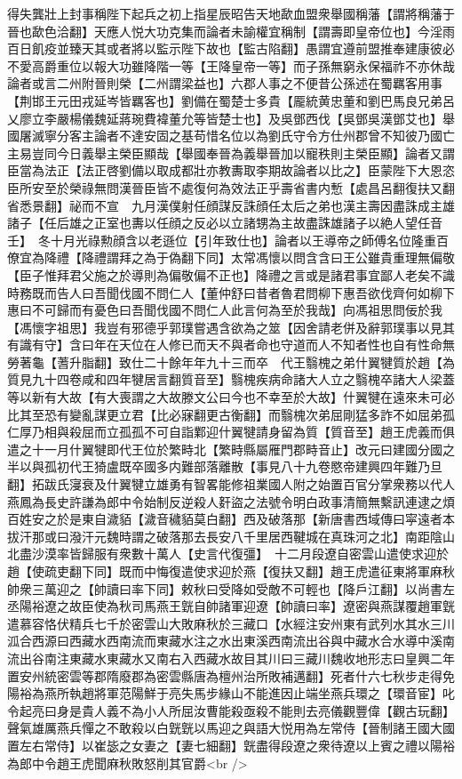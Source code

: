 得失龔壯上封事稱陛下起兵之初上指星辰昭告天地歃血盟衆舉國稱藩【謂將稱藩于晉也歃色洽翻】天應人悦大功克集而論者未諭權宜稱制【謂壽即皇帝位也】今淫雨百日飢疫並臻天其或者將以監示陛下故也【監古陷翻】愚謂宜遵前盟推奉建康彼必不愛高爵重位以報大功雖降階一等【王降皇帝一等】而子孫無窮永保福祚不亦休哉論者或言二州附晉則榮【二州謂梁益也】六郡人事之不便昔公孫述在蜀羈客用事【荆邯王元田戎延岑皆羈客也】劉備在蜀楚士多貴【龎統黄忠董和劉巴馬良兄弟呂乂廖立李嚴楊儀魏延蔣琬費褘董允等皆楚士也】及吳鄧西伐【吳鄧吳漢鄧艾也】舉國屠滅寧分客主論者不達安固之基苟惜名位以為劉氏守令方仕州郡曾不知彼乃國亡主易豈同今日義舉主榮臣顯哉【舉國奉晉為義舉晉加以寵秩則主榮臣顯】論者又謂臣當為法正【法正啓劉備以取成都壯亦教夀取李期故論者以比之】臣蒙陛下大恩恣臣所安至於榮祿無問漢晉臣皆不處復何為效法正乎壽省書内慙【處昌呂翻復扶又翻省悉景翻】祕而不宣　九月漢僕射任顔謀反誅顔任太后之弟也漢主壽因盡誅成主雄諸子【任后雄之正室也夀以任顔之反必以立諸甥為主故盡誅雄諸子以絶人望任音壬】　冬十月光祿勲顔含以老遜位【引年致仕也】論者以王導帝之師傅名位隆重百僚宜為降禮【降禮謂拜之為于偽翻下同】太常馮懷以問含含曰王公雖貴重理無偏敬【臣子惟拜君父施之於導則為偏敬偏不正也】降禮之言或是諸君事宜鄙人老矣不識時務既而告人曰吾聞伐國不問仁人【董仲舒曰昔者魯君問柳下惠吾欲伐齊何如柳下惠曰不可歸而有憂色曰吾聞伐國不問仁人此言何為至於我哉】向馮祖思問佞於我【馮懷字祖思】我豈有邪德乎郭璞嘗遇含欲為之筮【因舍請老併及辭郭璞事以見其有識有守】含曰年在天位在人修已而天不與者命也守道而人不知者性也自有性命無勞著龜【蓍升脂翻】致仕二十餘年年九十三而卒　代王翳槐之弟什翼犍質於趙【為質見九十四卷咸和四年犍居言翻質音至】翳槐疾病命諸大人立之翳槐卒諸大人梁蓋等以新有大故【有大喪謂之大故滕文公曰今也不幸至於大故】什翼犍在遠來未可必比其至恐有變亂謀更立君【比必寐翻更古衡翻】而翳槐次弟屈剛猛多詐不如屈弟孤仁厚乃相與殺屈而立孤孤不可自詣鄴迎什翼犍請身留為質【質音至】趙王虎義而俱遣之十一月什翼犍即代王位於繁畤北【繁畤縣屬雁門郡畤音止】改元曰建國分國之半以與孤初代王猗盧既卒國多内難部落離散【事見八十九卷愍帝建興四年難乃旦翻】拓跋氏寖衰及什翼犍立雄勇有智畧能修祖業國人附之始置百官分掌衆務以代人燕鳳為長史許謙為郎中令始制反逆殺人姧盜之法號令明白政事清簡無繫訊連逮之煩百姓安之於是東自濊貊【濊音穢貊莫白翻】西及破落那【新唐書西域傳曰寜遠者本拔汗那或曰潑汗元魏時謂之破落那去長安八千里居西鞬城在真珠河之北】南距陰山北盡沙漠率皆歸服有衆數十萬人【史言代復彊】　十二月段遼自密雲山遣使求迎於趙【使疏吏翻下同】既而中悔復遣使求迎於燕【復扶又翻】趙王虎遣征東將軍麻秋帥衆三萬迎之【帥讀曰率下同】敕秋曰受降如受敵不可輕也【降戶江翻】以尚書左丞陽裕遼之故臣使為秋司馬燕王皝自帥諸軍迎遼【帥讀曰率】遼密與燕謀覆趙軍皝遣慕容恪伏精兵七千於密雲山大敗麻秋於三藏口【水經注安州東有武列水其水三川泒合西源曰西藏水西南流而東藏水注之水出東溪西南流出谷與中藏水合水導中溪南流出谷南注東藏水東藏水又南右入西藏水故目其川曰三藏川魏收地形志曰皇興二年置安州統密雲等郡隋廢郡為密雲縣唐為檀州治所敗補邁翻】死者什六七秋步走得免陽裕為燕所執趙將軍范陽鮮于亮失馬步緣山不能進因止端坐燕兵環之【環音宦】叱令起亮曰身是貴人義不為小人所屈汝曹能殺亟殺不能則去亮儀觀豐偉【觀古玩翻】聲氣雄厲燕兵憚之不敢殺以白皝皝以馬迎之與語大悦用為左常侍【晉制諸王國大國置左右常侍】以崔毖之女妻之【妻七細翻】皝盡得段遼之衆待遼以上賓之禮以陽裕為郎中令趙王虎聞麻秋敗怒削其官爵<br />

